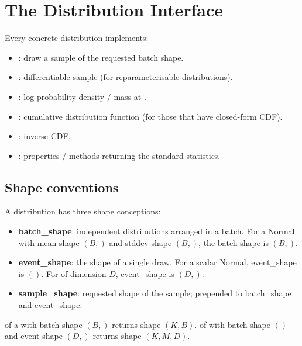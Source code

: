 \section{The Distribution Interface}
\label{sec:distributions:interface}

Every concrete distribution implements:

\begin{itemize}
  \item {}: draw a sample of the requested
    batch shape.
  \item {}: differentiable sample (for
    reparameterisable distributions).
  \item {}: log probability density / mass at
    .
  \item {}: cumulative distribution function (for
    those that have closed-form CDF).
  \item {}: inverse CDF.
  \item {}: properties /
    methods returning the standard statistics.
\end{itemize}

\subsection{Shape conventions}
\label{ssec:distributions:shapes}

A distribution has three shape conceptions:

\begin{itemize}
  \item \textbf{batch\_shape}: independent distributions arranged
    in a batch. For a Normal with mean shape $(B,)$ and stddev
    shape $(B,)$, the batch shape is $(B,)$.
  \item \textbf{event\_shape}: the shape of a single draw. For a
    scalar Normal, event\_shape is $()$. For
     of dimension $D$, event\_shape is
    $(D,)$.
  \item \textbf{sample\_shape}: requested shape of the sample;
    prepended to batch\_shape and event\_shape.
\end{itemize}

 of a  with batch shape
$(B,)$ returns shape $(K, B)$.  of
 with batch shape $()$ and event shape
$(D,)$ returns shape $(K, M, D)$.

